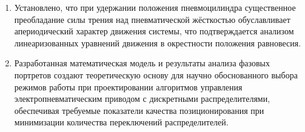 \begin{enumerate}
    \item Установлено, что при удержании положения пневмоцилиндра
    существенное преобладание силы трения над пневматической жёсткостью
    обуславливает апериодический характер движения системы, что подтверждается
    анализом линеаризованных уравнений движения в окрестности положения равновесия.
    
    \item Разработанная математическая модель и результаты анализа
    фазовых портретов создают теоретическую основу для научно обоснованного
    выбора режимов работы при проектировании алгоритмов управления
    электропневматическим приводом с дискретными распределителями, обеспечивая требуемые
    показатели качества позиционирования при минимизации количества переключений распределителей.
\end{enumerate}
